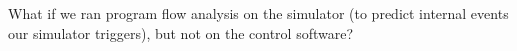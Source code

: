 What if we ran program flow analysis on the simulator (to predict internal events our
simulator triggers), but not on the control software?
